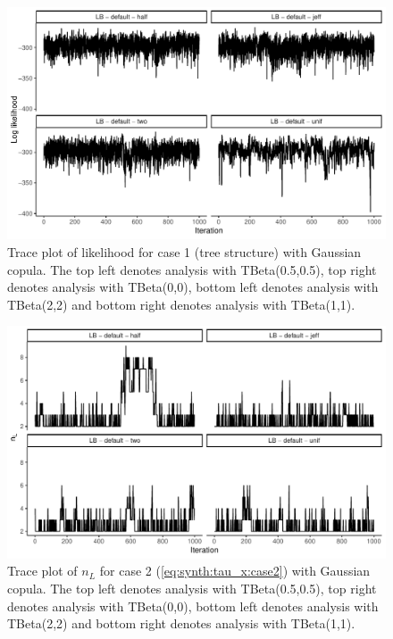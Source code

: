 \documentclass{amsart}
\begin{document}
\begin{figure}
	\centering
	\includegraphics[width = 0.75\linewidth]{trace_case1_gauss_like.pdf}
	\caption{Trace plot of likelihood for case 1 (tree structure) with Gaussian copula. The top left denotes analysis with TBeta(0.5,0.5), top right denotes analysis with TBeta(0,0), bottom left denotes analysis with TBeta(2,2) and bottom right denotes analysis with TBeta(1,1).}
	\label{fig:case1:gauss:like}
\end{figure}

\begin{figure}
	\centering
	\includegraphics[width = 0.75\linewidth]{trace_case2_gauss_nterm.pdf}
	\caption{Trace plot of $n_L$ for case 2 (\cref{eq:synth:tau_x:case2}) with Gaussian copula. The top left denotes analysis with TBeta(0.5,0.5), top right denotes analysis with TBeta(0,0), bottom left denotes analysis with TBeta(2,2) and bottom right denotes analysis with TBeta(1,1).}
	\label{fig:case2:gauss:nterm}
\end{figure}
\end{document}
